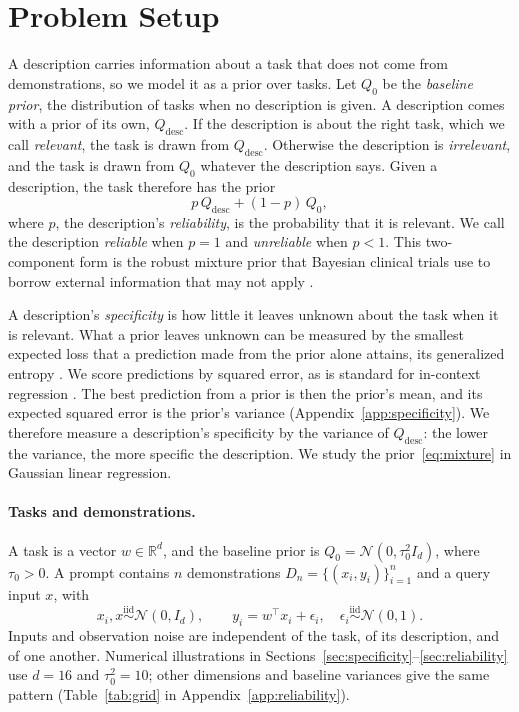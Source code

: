\documentclass{article}
\theoremstyle{definition}
\newcommand{\R}{\mathbb{R}}
\begin{document}
\section{Problem Setup}\label{sec:setting}

A description carries information about a task that does not come from demonstrations, so we model it as a prior over tasks. Let $Q_0$ be the \emph{baseline prior}, the distribution of tasks when no description is given. A description comes with a prior of its own, $Q_{\mathrm{desc}}$. If the description is about the right task, which we call \emph{relevant}, the task is drawn from $Q_{\mathrm{desc}}$. Otherwise the description is \emph{irrelevant}, and the task is drawn from $Q_0$ whatever the description says. Given a description, the task therefore has the prior
\begin{equation}\label{eq:mixture}
p\,Q_{\mathrm{desc}}+(1-p)\,Q_0,
\end{equation}
where $p$, the description's \emph{reliability}, is the probability that it is relevant. We call the description \emph{reliable} when $p=1$ and \emph{unreliable} when $p<1$. This two-component form is the robust mixture prior that Bayesian clinical trials use to borrow external information that may not apply \citep{schmidli2014}.

A description's \emph{specificity} is how little it leaves unknown about the task when it is relevant. What a prior leaves unknown can be measured by the smallest expected loss that a prediction made from the prior alone attains, its generalized entropy \citep{grunwald2004}. We score predictions by squared error, as is standard for in-context regression \citep{garg2022}. The best prediction from a prior is then the prior's mean, and its expected squared error is the prior's variance (Appendix~\ref{app:specificity}). We therefore measure a description's specificity by the variance of $Q_{\mathrm{desc}}$: the lower the variance, the more specific the description. We study the prior~\eqref{eq:mixture} in Gaussian linear regression.

\paragraph{Tasks and demonstrations.}
A task is a vector $w\in\R^d$, and the baseline prior is $Q_0=\mathcal{N}(0,\tau_0^2I_d)$, where $\tau_0>0$. A prompt contains $n$ demonstrations $D_n=\{(x_i,y_i)\}_{i=1}^n$ and a query input $x$, with
\[
x_i,x\overset{\mathrm{iid}}{\sim}\mathcal{N}(0,I_d),\qquad
y_i=w^\top x_i+\epsilon_i,\quad
\epsilon_i\overset{\mathrm{iid}}{\sim}\mathcal{N}(0,1).
\]
Inputs and observation noise are independent of the task, of its description, and of one another. Numerical illustrations in Sections~\ref{sec:specificity}--\ref{sec:reliability} use $d=16$ and $\tau_0^2=10$; other dimensions and baseline variances give the same pattern (Table~\ref{tab:grid} in Appendix~\ref{app:reliability}).
\end{document}
